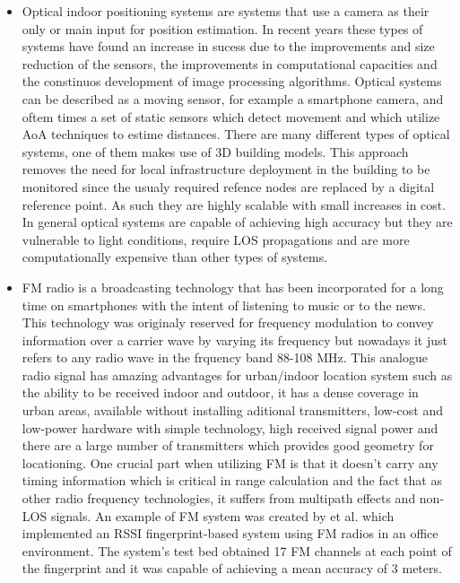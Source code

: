 \begin{itemize}

\item [] Optical indoor positioning systems are systems that use a camera as their only or main input for position estimation. In recent years these types of systems have found an increase in sucess due to the improvements and size reduction of the sensors, the improvements in computational capacities and the constinuos development of image processing algorithms. Optical systems can be described as a moving sensor, for example a smartphone camera, and oftem times a set of static sensors which detect movement and which utilize \ac{AoA} techniques to estime distances. There are many different types of optical systems, one of them makes use of 3D building models. This approach removes the need for local infrastructure deployment in the building to be monitored since the usualy required refence nodes are replaced by a digital reference point. As such they are highly scalable with small increases in cost.
In general optical systems are capable of achieving high accuracy but they are vulnerable to light conditions, require \ac{LOS} propagations and are more computationally expensive than other types of systems.


\item [] \ac{FM} radio is a broadcasting technology that has been incorporated for a long time on smartphones with the intent of listening to music or to the news. This technology was originaly reserved for frequency modulation to convey information over a carrier wave by varying its frequency but nowadays it just refers to any radio wave in the frquency band 88-108 MHz. This analogue radio signal has amazing advantages for urban/indoor location system such as the ability to be received indoor and outdoor, it has a dense coverage in urban areas, available without installing aditional transmitters, low-cost and low-power hardware with simple technology, high received signal power and there are a large number of transmitters which provides good geometry for locationing. One crucial part when utilizing \ac{FM} is that it doesn't carry any timing information which is critical in range calculation and the fact that as other radio frequency technologies, it suffers from  multipath effects and non-\ac{LOS} signals. An example of FM system was created by  et al. \cite{fm} which implemented an \ac{RSSI} fingerprint-based system using FM radios in an office environment. The system's test bed obtained 17 FM channels at each point of the fingerprint and it was capable of achieving a mean accuracy of 3 meters.



\end{itemize}
